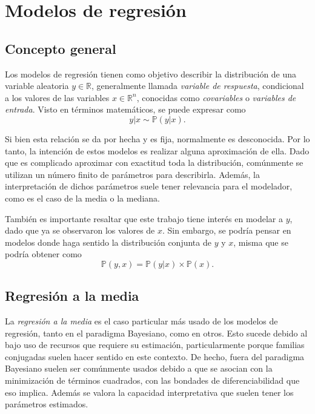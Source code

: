 \chapter[Modelos de regresi\'on]{Modelos de regresi\'on}

\section{Concepto general}

Los modelos de regresi\'on tienen como objetivo describir la distribuci\'on de una variable aleatoria $y \in \mathbb{R}$, generalmente llamada \textit{variable de respuesta}, condicional a los valores de las variables $x \in \mathbb{R}^n$, conocidas como \textit{covariables} o \textit{variables de entrada}. Visto en t\'erminos matem\'aticos, se puede expresar como
\begin{equation*}
    y|x \sim \mathbb{P}(y|x).
\end{equation*}

Si bien esta relaci\'on se da por hecha y es fija, normalmente es desconocida. Por lo tanto, la intenci\'on de estos modelos es realizar alguna aproximaci\'on de ella. Dado que es complicado aproximar con exactitud toda la distribuci\'on, com\'unmente se utilizan un n\'umero finito de par\'ametros para describirla. Adem\'as, la interpretaci\'on de dichos par\'ametros suele tener relevancia para el modelador, como es el caso de la media o la mediana. 

Tambi\'en es importante resaltar que este trabajo tiene inter\'es en modelar a $y$, dado que ya se observaron los valores de $x$. Sin embargo, se podr\'ia pensar en modelos donde haga sentido la distribuci\'on conjunta de $y$ y $x$, misma que se podr\'ia obtener como
\begin{equation*}
    \mathbb{P}(y,x) = \mathbb{P}(y|x) \times \mathbb{P}(x).
\end{equation*}

\section{Regresión a la media}

La \textit{regresi\'on a la media} es el caso particular m\'as usado de los modelos de regresi\'on, tanto en el paradigma Bayesiano, como en otros. Esto sucede debido al bajo uso de recursos que requiere su estimaci\'on, particularmente porque familias conjugadas suelen hacer sentido en este contexto. De hecho, fuera del paradigma Bayesiano suelen ser com\'unmente usados debido a que se asocian con la minimizaci\'on de t\'erminos cuadrados, con las bondades de diferenciabilidad que eso implica. Adem\'as se valora la capacidad interpretativa que suelen tener los par\'ametros estimados.

